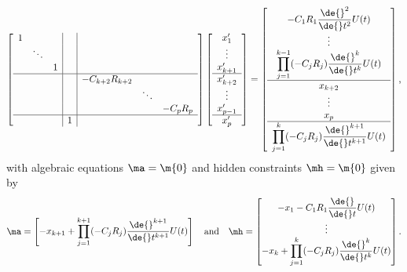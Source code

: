 \begin{equation}
  \left[\begin{array}{ccc|c|ccc}
    1 &        &   & \\
      & \ddots &   & \\
      &        & 1 & \\ \hline
      &        &   & & -C_{k+2} R_{k+2} \\
      &        &   & & & \ddots \\
      &        &   & & & & -C_{p} R_{p} \\ \hline
      &        &   & 1 \\
  \end{array}\right]
  \left[\begin{array}{c}
    x_1^{\prime} \\ \vdots \\ x_{k+1}^{\prime} \\ \hline
    x_{k+2}^{\prime} \\ \vdots \\ x_{p-1}^{\prime} \\ \hline
    x_p^{\prime}
  \end{array}\right] = \left[\begin{array}{c}
    -C_1R_1 \dfrac{\de{}^2}{\de{}t^2}U(t) \\
    \vdots \\
    \displaystyle\prod_{j=1}^{k-1} (-C_j R_j) \dfrac{\de{}^k}{\de{}t^k}U(t) \\ \hline
    x_{k+2} \\ \vdots \\ x_p \\ \hline
    \displaystyle\prod_{j=1}^{k} (-C_j R_j) \dfrac{\de{}^{k+1}}{\de{}t^{k+1}}U(t)
  \end{array}\right] \text{,}
\end{equation}
%
with algebraic equations $\ma = \m{0}$ and hidden constraints $\mh = \m{0}$ given by
%
\begin{equation}
  \ma = \begin{bmatrix}
    -x_{k+1} + \displaystyle\prod_{j=1}^{k+1} (-C_j R_j) \dfrac{\de{}^{k+1}}{\de{}t^{k+1}}U(t)
  \end{bmatrix}
  \quad \text{and} \quad
  \mh = \begin{bmatrix}
    -x_{1} - C_1R_1 \dfrac{\de{}}{\de{}t}U(t) \\
    \vdots \\
    -x_k + \displaystyle\prod_{j=1}^{k} (-C_j R_j) \dfrac{\de{}^{k}}{\de{}t^{k}}U(t)
  \end{bmatrix} \text{.}
\end{equation}
